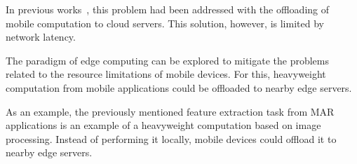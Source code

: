In previous works~\cite{Mobile Cloud Computing}, this problem had been addressed with the offloading of mobile computation to cloud servers. This solution, however, is limited by network latency.

The paradigm of edge computing can be explored to mitigate the problems related to the resource limitations of mobile devices. For this, heavyweight computation from mobile applications could be offloaded to nearby edge servers. 

As an example, the previously mentioned feature extraction task from MAR applications is an example of a heavyweight computation based on image processing. Instead of performing it locally, mobile devices could offload it to nearby edge servers. 

